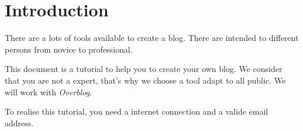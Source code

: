 \documentclass[a4paper,10pt]{article}
\begin{document}
\section{Introduction}
There are a lots of tools available to create a blog. There are intended to different persons from novice to professional.

This document is a tutorial to help you to create your own blog. We consider that you are not a expert, that's why we choose a tool adapt to all public. We will work with \emph{Overblog}.

To realise this tutorial, you need a internet connection and a valide email address.

\newpage
\end{document}
